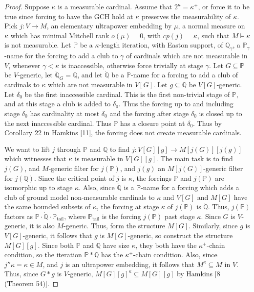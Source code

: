 \documentclass[10pt,leqno]{amsart}
\begin{document}
\begin{proof} Suppose $\kappa$ is a measurable cardinal. Assume that $2^{\kappa} = \kappa^+$, or force it to be true since forcing to have the GCH hold at $\kappa$ preserves the measurability of $\kappa$. Pick $j:V \to M$, an elementary ultrapower embedding by $\mu$, a normal measure on $\kappa$ which has minimal Mitchell rank $o(\mu) = 0$, with $cp(j) = \kappa$, such that $M \models \kappa$ is not measurable. Let $\mathbb{P}$ be a $\kappa$-length iteration, with Easton support, of $\mathbb{Q}_{\gamma}$, a $\mathbb{P}_{\gamma}$-name for the forcing to add a club to $\gamma$ of cardinals which are not measurable in $V$, whenever $\gamma < \kappa$ is inaccessible, otherwise force trivially at stage $\gamma$. Let $G \subseteq \mathbb{P}$ be $V$-generic, let $\dot{\mathbb{Q}}_G = \mathbb{Q}$, and let $\dot{\mathbb{Q}}$ be a $\mathbb{P}$-name for a forcing to add a club of cardinals to $\kappa$ which are not measurable in $V[G]$. Let $g \subseteq \mathbb{Q}$ be $V[G]$-generic. Let $\delta_0$ be the first inaccessible cardinal. This is the first non-trivial stage of $\mathbb{P}$, and at this stage a club is added to $\delta_0$. Thus the forcing up to and including stage $\delta_0$ has cardinality at most $\delta_0$ and the forcing after stage $\delta_0$ is closed up to the next inaccessible cardinal. Thus $\mathbb{P}$ has a closure point at $\delta_0$. Thus by Corollary 22 in Hamkins [11], the forcing does not create measurable cardinals. 


We want to lift $j$ through $\mathbb{P}$ and $\mathbb{Q}$ to find $j:V[G][g] \to M[j(G)][j(g)]$ which witnesses that $\kappa$ is measurable in $V[G][g]$. The main task is to find $j(G)$, and $M$-generic filter for $j(\mathbb{P})$, and $j(g)$ an $M[j(G)]$-generic filter for $j(\mathbb{Q})$. Since the critical point of $j$ is $\kappa$, the forcings $\mathbb{P}$ and $j(\mathbb{P})$ are isomorphic up to stage $\kappa$. Also, since $\dot{\mathbb{Q}}$ is a $\mathbb{P}$-name for a forcing which adds a club of ground model non-measurable cardinals to $\kappa$ and $V[G]$ and $M[G]$ have the same bounded subsets of $\kappa$, the forcing at stage $\kappa$ of $j(\mathbb{P})$ is $\dot{\mathbb{Q}}$.  Thus, $j(\mathbb{P})$ factors as $\mathbb{P}\cdot\dot{\mathbb{Q}}\cdot\mathbb{P}_{\mbox{tail}}$, where $\mathbb{P}_{\mbox{tail}}$ is the forcing $j(\mathbb{P})$ past stage $\kappa$. Since $G$ is $V$-generic, it is also $M$-generic. Thus, form the structure $M[G]$. Similarly, since $g$ is $V[G]$-generic, it follows that $g$ is $M[G]$-generic, so construct the structure $M[G][g]$. Since both $\mathbb{P}$ and $\mathbb{Q}$ have size $\kappa$, they both have the $\kappa^+$-chain condition, so the iteration $\mathbb{P}*\mathbb{Q}$ has the $\kappa^+$-chain condition. Also, since $j''\kappa = \kappa \in M$, and $j$ is an ultrapower embedding, it follows that $M^{\kappa} \subseteq M$ in $V$. Thus, since $G*g$ is $V$-generic, $M[G][g]^{\kappa} \subseteq M[G][g]$ by Hamkins [8 (Theorem 54)]. 


\end{proof}
\end{document}
